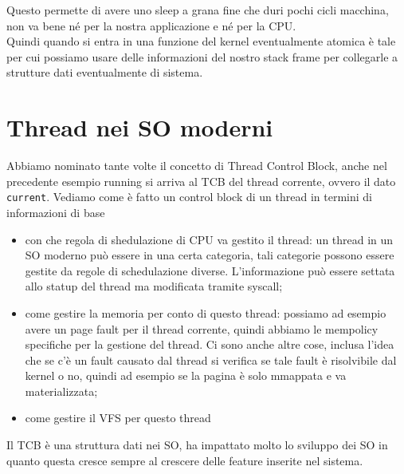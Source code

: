 \documentclass[12pt, oneside]{extbook}
\begin{document}
Questo permette di avere uno sleep a grana fine che duri pochi cicli macchina, non va bene né per la nostra applicazione e né per la CPU.\\Quindi quando si entra in una funzione del kernel eventualmente atomica è tale per cui possiamo usare delle informazioni del nostro stack frame per collegarle a strutture dati eventualmente di sistema.
\section{Thread nei SO moderni}
Abbiamo nominato tante volte il concetto di Thread Control Block, anche nel precedente esempio running si arriva al TCB del thread corrente, ovvero il dato \texttt{current}. Vediamo come è fatto un control block di un thread in termini di informazioni di base
\begin{itemize}
\item con che regola di shedulazione di CPU va gestito il thread: un thread in un SO moderno può essere in una certa categoria, tali categorie possono essere gestite da regole di schedulazione diverse. L'informazione può essere settata allo statup del thread ma modificata tramite syscall;
\item come gestire la memoria per conto di questo thread: possiamo ad esempio avere un page fault per il thread corrente, quindi abbiamo le mempolicy specifiche per la gestione del thread. Ci sono anche altre cose, inclusa l'idea che se c'è un fault causato dal thread si verifica se tale fault è risolvibile dal kernel o no, quindi ad esempio se la pagina è solo mmappata e va materializzata;
\item come gestire il VFS per questo thread
\end{itemize}
Il TCB è una struttura dati nei SO, ha impattato molto lo sviluppo dei SO in quanto questa cresce sempre al crescere delle feature inserite nel sistema.
\end{document}
